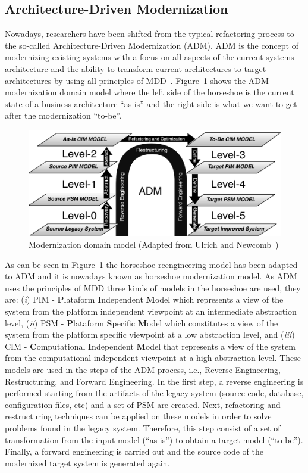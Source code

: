\documentclass[a4paper,twoside]{article}
\begin{document}
\subsection{Architecture-Driven Modernization}

Nowadays, researchers have been shifted from the typical refactoring process to the so-called Architecture-Driven Modernization (ADM). ADM is the concept of modernizing existing systems with a focus on all aspects of the current systems architecture and the ability to transform current architectures to target architectures by using all principles of MDD~\cite[p.~60]{Ulrich:2010:IST:1841736}. Figure~\ref{horseshoe} shows the ADM modernization domain model where the left side of the horseshoe is the current state of a business architecture ``as-is'' and the right side is what we want to get after the modernization ``to-be''.


\begin{figure}[!ht]
\centering
  \includegraphics[scale=0.37]{figuras/Fonte_horse_shoe}
\caption{Modernization domain model (Adapted from Ulrich and Newcomb~\cite{Ulrich:2010:IST:1841736})}
\label{horseshoe}
\end{figure}

As can be seen in Figure~\ref{horseshoe} the horseshoe reengineering model has been adapted to ADM and it is nowadays known as horseshoe modernization model. As ADM uses the principles of MDD three kinds of models in the horseshoe are used, they are: (\textit{i}) PIM - \textbf{P}lataform \textbf{I}ndependent \textbf{M}odel which represents a view of the system from the platform independent viewpoint at an intermediate abstraction level, (\textit{ii}) PSM - \textbf{P}lataform \textbf{S}pecific \textbf{M}odel which constitutes a view of the system from the platform specific viewpoint at a low abstraction level, and (\textit{iii}) CIM - \textbf{C}omputational \textbf{I}ndependent \textbf{M}odel that represents a view of the system from the computational independent viewpoint at a high abstraction level. These models are used in the steps of the ADM process, i.e., Reverse Engineering, Restructuring, and Forward Engineering. In the first step, a reverse engineering is performed starting from the artifacts of the legacy system (source code, database, configuration files, etc) and a set of PSM are created. Next, refactoring and restructuring techniques can be applied on these models in order to solve problems found in the legacy system. Therefore, this step consist of a set of transformation from the input model (``as-is'') to obtain a target model (``to-be''). Finally, a forward engineering is carried out and the source code of the modernized target system is generated again. 
\end{document}
